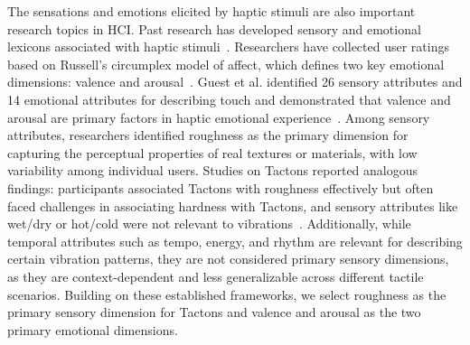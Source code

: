 The sensations and emotions elicited by haptic stimuli are also important research topics in HCI.
Past research has developed sensory and emotional lexicons associated with haptic stimuli~\cite{holliins1993perceptual, hollins2000individual, soufflet2004comparison, tiest2006analysis}.
Researchers have collected user ratings based on Russell's circumplex model of affect, which defines two key emotional dimensions: valence and arousal~\cite{russell1980circumplex}.
Guest et al. identified 26 sensory attributes and 14 emotional attributes for describing touch and demonstrated that valence and arousal are primary factors in haptic emotional experience~\cite{guest2011development}.
Among sensory attributes, researchers identified roughness as the primary dimension for capturing the perceptual properties of real textures or materials, with low variability among individual users.
Studies on Tactons reported analogous findings: participants associated Tactons with roughness effectively but often faced challenges in associating hardness with Tactons, and sensory attributes like wet/dry or hot/cold were not relevant to vibrations~\cite{seifi2013first, seifi2015vibviz}.
Additionally, while temporal attributes such as tempo, energy, and rhythm are relevant for describing certain vibration patterns, they are not considered primary sensory dimensions, as they are context-dependent and less generalizable across different tactile scenarios.
Building on these established frameworks, we select roughness as the primary sensory dimension for Tactons and valence and arousal as the two primary emotional dimensions.


